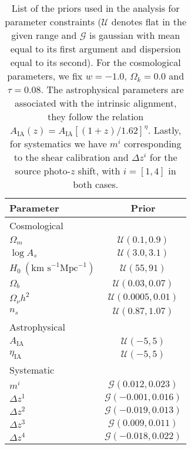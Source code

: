 \documentclass[aps, prd, twocolumn, superscriptaddress, nofootinbib, amssymb, amsmath]{revtex4-2}
\begin{document}
\begin{table}
	\begin{ruledtabular}
		\begin{tabular} { l c} 
			Parameter & Prior	\\ \hline
			Cosmological & \\ [1ex]
			$\Omega_m$ & $\mathcal{U}(0.1, 0.9)$ \\
			$\log A_s$ & $\mathcal{U}(3.0, 3.1)$ \\
			$H_0 \ (\text{km s}^{-1}\text{Mpc}^{-1})$ & $\mathcal{U}(55, 91)$\\
			$\Omega_b$ & $\mathcal{U}(0.03, 0.07)$ \\
			$\Omega_\nu h^2$ & $\mathcal{U}(0.0005, 0.01)$ \\
			$n_s$ & $\mathcal{U}(0.87, 1.07)$ \\ [1ex]
			\hline
			Astrophysical & \\ [1ex]
			$A_{\text{IA}}$	& $\mathcal{U}(-5, 5)$ \\
			$\eta_{\text{IA}}$& $\mathcal{U}(-5, 5)$ \\ [1ex]
			\hline
			Systematic      & \\ [1ex]
			$m^i$			& $\mathcal{G}(0.012, 0.023)$ \\
			$\Delta z^1$	& $\mathcal{G}(-0.001, 0.016)$ \\
			$\Delta z^2$	& $\mathcal{G}(-0.019, 0.013)$ \\
			$\Delta z^3$	& $\mathcal{G}(0.009, 0.011)$ \\
			$\Delta z^4$	& $\mathcal{G}(-0.018, 0.022)$ \\ [1ex]
		\end{tabular}
	\end{ruledtabular}
	\caption{List of the priors used in the analysis for parameter constraints ($\mathcal{U}$ denotes flat in the given range and $\mathcal{G}$ is gaussian with mean equal to its first argument and dispersion equal to its second). For the cosmological parameters, we fix $w = -1.0$, $\Omega_k =  0.0$ and $\tau =  0.08$. The astrophysical parameters are associated with the intrinsic alignment, they follow the relation $A_{\text{IA}}(z) = A_{\text{IA}}[(1+z)/1.62]^{\eta}$. Lastly, for systematics we have $m^i$ corresponding to the shear calibration and  $\Delta z^i$ for the source photo-$z$ shift, with $i = [1, 4]$ in both cases.}
	\label{tab:priors}
\end{table}
\end{document}
